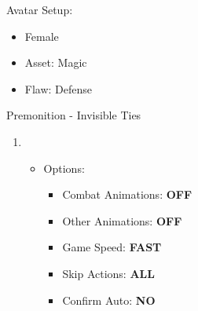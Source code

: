 Avatar Setup:
\begin{itemize}
	\item Female
	\item Asset: Magic
	\item Flaw: Defense
\end{itemize}
\begin{battlespecial}{Premonition - Invisible Ties}
\begin{enumerate}
\item \ 
\begin{itemize}
\item Options:
\begin{itemize}
\item Combat Animations: \textbf{OFF}
\item Other Animations: \textbf{OFF}
\item Game Speed: \textbf{FAST}
\item Skip Actions: \textbf{ALL}
\item Confirm Auto: \textbf{NO}
\end{itemize}
\autoblitz
\auto
\end{itemize}
\autoturn
\end{enumerate}
\end{battlespecial}